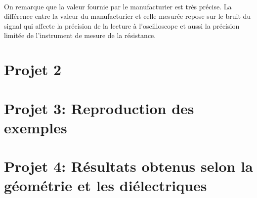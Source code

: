 \paragraph{}On remarque que la valeur fournie par le manufacturier est très précise. La différence entre la valeur du manufacturier et celle mesurée repose sur le bruit du signal qui affecte la précision de la lecture à l'oscilloscope et aussi la précision limitée de l'instrument de mesure de la résistance. 
\newpage
\section{Projet 2}


\section{Projet 3: Reproduction des exemples}
\newpage
\section{Projet 4: Résultats obtenus selon la géométrie et les diélectriques}


